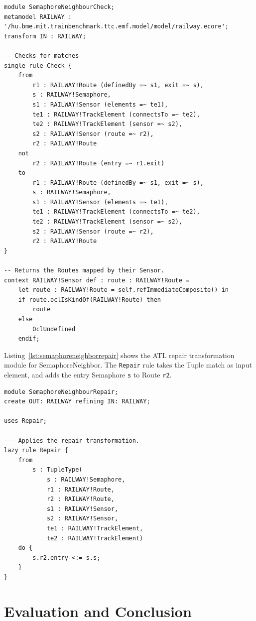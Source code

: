 \documentclass[submission,copyright,creativecommons]{eptcs}
\begin{document}
\lstset{language=simplegt}
\begin{lstlisting}[float=htb, caption={SemaphoreNeighborCheck transformation module in SimpleGT}, label=lst:semaphoreneighborcheck, captionpos=b, frame=tb, belowskip=-10pt]
module SemaphoreNeighbourCheck;
metamodel RAILWAY : '/hu.bme.mit.trainbenchmark.ttc.emf.model/model/railway.ecore';
transform IN : RAILWAY;

-- Checks for matches
single rule Check {
	from
		r1 : RAILWAY!Route (definedBy =~ s1, exit =~ s),
		s : RAILWAY!Semaphore,
		s1 : RAILWAY!Sensor (elements =~ te1),
		te1 : RAILWAY!TrackElement (connectsTo =~ te2),
		te2 : RAILWAY!TrackElement (sensor =~ s2),
		s2 : RAILWAY!Sensor (route =~ r2),
		r2 : RAILWAY!Route
	not
		r2 : RAILWAY!Route (entry =~ r1.exit)
	to
		r1 : RAILWAY!Route (definedBy =~ s1, exit =~ s),
		s : RAILWAY!Semaphore,
		s1 : RAILWAY!Sensor (elements =~ te1),
		te1 : RAILWAY!TrackElement (connectsTo =~ te2),
		te2 : RAILWAY!TrackElement (sensor =~ s2),
		s2 : RAILWAY!Sensor (route =~ r2),
		r2 : RAILWAY!Route
}

-- Returns the Routes mapped by their Sensor.
context RAILWAY!Sensor def : route : RAILWAY!Route =
	let route : RAILWAY!Route = self.refImmediateComposite() in
	if route.oclIsKindOf(RAILWAY!Route) then
		route
	else
		OclUndefined
	endif;
\end{lstlisting}

Listing~\ref{lst:semaphoreneighborrepair} shows the ATL repair transformation module for SemaphoreNeighbor. The \texttt{Repair} rule takes the Tuple match as input element, and adds the entry Semaphore \texttt{s} to Route \texttt{r2}.

\lstset{language=atl}
\begin{lstlisting}[float=htb, caption={SemaphoreNeighbor repair transformation module in ATL}, label=lst:semaphoreneighborrepair, captionpos=b, frame=tb, belowskip=-10pt]
module SemaphoreNeighbourRepair;
create OUT: RAILWAY refining IN: RAILWAY;

uses Repair;

--- Applies the repair transformation.
lazy rule Repair {
	from
		s : TupleType(
			s : RAILWAY!Semaphore,
			r1 : RAILWAY!Route,
			r2 : RAILWAY!Route,
			s1 : RAILWAY!Sensor,
			s2 : RAILWAY!Sensor,
			te1 : RAILWAY!TrackElement, 
			te2 : RAILWAY!TrackElement)
	do {
		s.r2.entry <:= s.s;
	}
}
\end{lstlisting}

\section{Evaluation and Conclusion}
\label{sec:eval}
\end{document}
